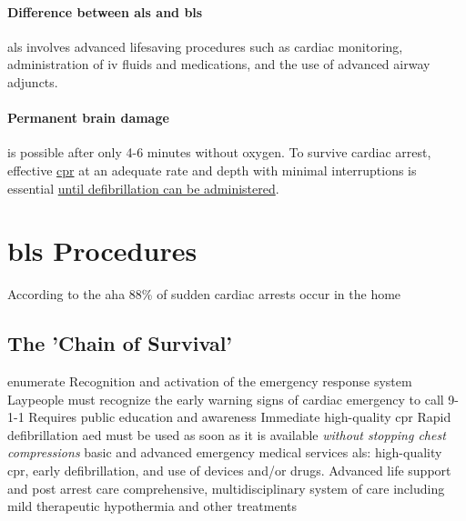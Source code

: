 \documentclass[../../EMT-169.tex]{subfiles}
\begin{document}
\paragraph{Difference between \acrshort{als} and \acrshort{bls}} \acrshort{als} involves advanced lifesaving procedures such as cardiac monitoring, administration of \acrshort{iv} fluids and medications, and the use of advanced airway adjuncts.

\paragraph{Permanent brain damage} is possible after only 4-6 minutes without oxygen. \newline
To survive cardiac arrest, effective \underline{\acrshort{cpr}} at an adequate rate and depth with minimal interruptions is essential \underline{until defibrillation can be administered}.\hfill \\


\section{\acrshort{bls} Procedures}
According to the \acrshort{aha} 88\% of sudden cardiac arrests occur in the home 

\subsection{The 'Chain of Survival'}
\begin{outline}{enumerate}
	\1 Recognition and activation of the emergency response system
		\2 Laypeople must recognize the early warning signs of cardiac emergency to call 9-1-1
		\2 Requires public education and awareness
	\1 Immediate high-quality \acrshort{cpr}
	\1 Rapid defibrillation 
		\2 \acrshort{aed} must be used as soon as it is available \textit{without stopping chest compressions}
	\1 basic and advanced emergency medical services
		\2 \acrshort{als}: high-quality \acrshort{cpr}, early defibrillation, and use of devices and/or drugs.
	\1 Advanced life support and post arrest care
		\2 comprehensive, multidisciplinary system of care including mild therapeutic hypothermia and other treatments
\end{outline}
\end{document}
